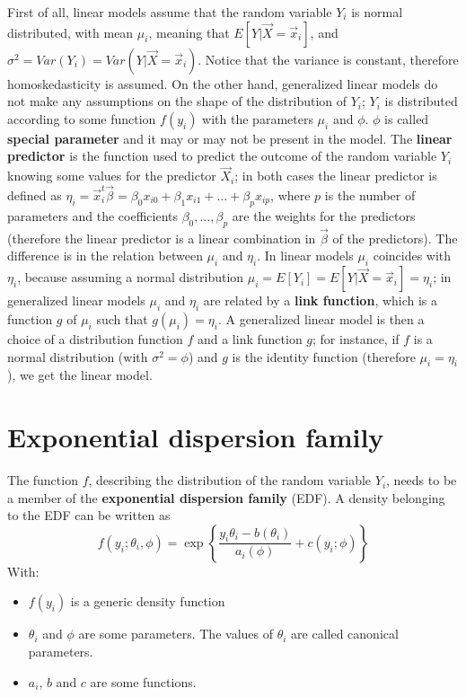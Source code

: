     First of all, linear models assume that the random variable $Y_i$ is normal distributed, with mean $\mu_i$, meaning that $E[Y|\vec{X}=\vec{x}_i]$, and $\sigma^2 = Var(Y_i) = Var(Y|\vec{X}=\vec{x}_i)$. Notice that the variance is constant, therefore homoskedasticity is assumed. On the other hand, generalized linear models do not make any assumptions on the shape of the distribution of $Y_i$; $Y_i$ is distributed according to some function $f(y_i)$ with the parameters $\mu_i$ and $\phi$. $\phi$ is called \textbf{special parameter} and it may or may not be present in the model.
    The \textbf{linear predictor} is the function used to predict the outcome of the random variable $Y_i$ knowing some values for the predictor $\vec{X}_i$; in both cases the linear predictor is defined as $\eta_i = \vec{x}_i^t\vec{\beta} = \beta_0x_{i0} + \beta_1x_{i1} + \dots + \beta_px_{ip}$, where $p$ is the number of parameters and the coefficients $\beta_0, \dots, \beta_p$ are the weights for the predictors (therefore the linear predictor is a linear combination in $\vec{\beta}$ of the predictors). The difference is in the relation between $\mu_i$ and $\eta_i$. In linear models $\mu_i$ coincides with $\eta_i$, because assuming a normal distribution $\mu_i = E[Y_i] = E[Y|\vec{X} = \vec{x}_i] = \eta_i$; in generalized linear models $\mu_i$ and $\eta_i$ are related by a \textbf{link function}, which is a function $g$ of $\mu_i$ such that $g(\mu_i) = \eta_i$.
    A generalized linear model is then a choice of a distribution function $f$ and a link function $g$; for instance, if $f$ is a normal distribution (with $\sigma^2 = \phi$) and $g$ is the identity function (therefore $\mu_i = \eta_i$), we get the linear model. 
  
  \section{Exponential dispersion family}
    The function $f$, describing the distribution of the random variable $Y_i$, needs to be a member of the \textbf{exponential dispersion family} (EDF). A density belonging to the EDF can be written as
    $$f(y_i;\theta_i,\phi)=\exp\left\{\frac{y_i\theta_i-b(\theta_i)}{a_i(\phi)}+c(y_i;\phi)\right\}$$
    With:
    \begin{itemize}
      \item $f(y_i)$ is a generic density function 
      \item $\theta_i$ and $\phi$ are some parameters. The values of $\theta_i$ are called canonical parameters.
      \item $a_i$, $b$ and $c$ are some functions.
    \end{itemize}

